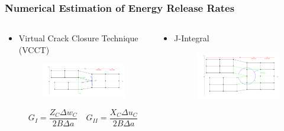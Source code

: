 \documentclass[first,firstsupp,lastsupp,handout,last,hyperref,table]{ETHclass}
\begin{document}
\begin{frame}
\frametitle{\small Numerical Estimation of Energy Release Rates}
\vspace{-0.4cm}
\centering
\scriptsize
\begin{columns}
\begin{column}{0.5\textwidth}
\centering
\vspace*{-1.4cm}
\begin{itemize}[label=]
\item Virtual Crack Closure Technique (VCCT)
\begin{figure}
\includegraphics[width=\columnwidth]{VCCT.pdf}
  \label{fig:vcct}
\end{figure}

\begin{equation*}
G_{I}=\frac{Z_{C}\Delta w_{C}}{2B\Delta a}\quad G_{II}=\frac{X_{C}\Delta u_{C}}{2B\Delta a}
\end{equation*}

\end{itemize}
\end{column}
\begin{column}{0.5\textwidth}
\centering
\begin{itemize}[label=]
\item J-Integral

\begin{figure}
\includegraphics[width=\columnwidth]{J-integral.pdf}
  \label{fig:jintegral}
\end{figure}


\end{itemize}
\end{column}
\end{columns}
\end{frame}
\end{document}
